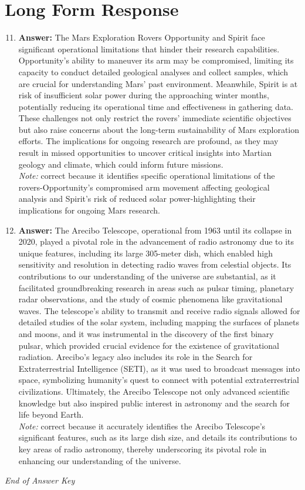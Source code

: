 \documentclass[12pt]{article}
\begin{document}
\section*{Long Form Response}
\begin{enumerate}[label=\arabic*.]
\setcounter{enumi}{10}
\item \textbf{Answer:} The Mars Exploration Rovers Opportunity and Spirit face significant operational limitations that hinder their research capabilities. Opportunity's ability to maneuver its arm may be compromised, limiting its capacity to conduct detailed geological analyses and collect samples, which are crucial for understanding Mars' past environment. Meanwhile, Spirit is at risk of insufficient solar power during the approaching winter months, potentially reducing its operational time and effectiveness in gathering data. These challenges not only restrict the rovers' immediate scientific objectives but also raise concerns about the long-term sustainability of Mars exploration efforts. The implications for ongoing research are profound, as they may result in missed opportunities to uncover critical insights into Martian geology and climate, which could inform future missions.
\\ \textit{Note:} correct because it identifies specific operational limitations of the rovers-Opportunity's compromised arm movement affecting geological analysis and Spirit's risk of reduced solar power-highlighting their implications for ongoing Mars research.
\item \textbf{Answer:} The Arecibo Telescope, operational from 1963 until its collapse in 2020, played a pivotal role in the advancement of radio astronomy due to its unique features, including its large 305-meter dish, which enabled high sensitivity and resolution in detecting radio waves from celestial objects. Its contributions to our understanding of the universe are substantial, as it facilitated groundbreaking research in areas such as pulsar timing, planetary radar observations, and the study of cosmic phenomena like gravitational waves. The telescope's ability to transmit and receive radio signals allowed for detailed studies of the solar system, including mapping the surfaces of planets and moons, and it was instrumental in the discovery of the first binary pulsar, which provided crucial evidence for the existence of gravitational radiation. Arecibo's legacy also includes its role in the Search for Extraterrestrial Intelligence (SETI), as it was used to broadcast messages into space, symbolizing humanity's quest to connect with potential extraterrestrial civilizations. Ultimately, the Arecibo Telescope not only advanced scientific knowledge but also inspired public interest in astronomy and the search for life beyond Earth.
\\ \textit{Note:} correct because it accurately identifies the Arecibo Telescope's significant features, such as its large dish size, and details its contributions to key areas of radio astronomy, thereby underscoring its pivotal role in enhancing our understanding of the universe.
\end{enumerate}

\vfill
\noindent\textit{End of Answer Key}
\end{document}
